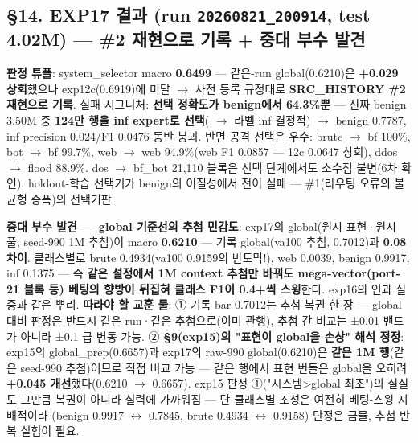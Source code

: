 \subsection{§14. EXP17 결과 (run \texttt{20260821\allowbreak{}\_\allowbreak{}\allowbreak{}200914}, test 4.02M) — \#2 재현으로 기록 +\allowbreak{} 중대 부수 발견}
\textbf{판정 튜플}: system\_\allowbreak{}selector macro \textbf{0.6499} — 같은-run global(0.6210)은 \textbf{+\allowbreak{}0.029 상회}했으나 exp12c(0.6919)에 미달  \ensuremath{\rightarrow}  사전 등록 규정대로 \textbf{SRC\_\allowbreak{}HISTORY \#2 재현으로 기록}. 실패 시그니처: \textbf{선택 정확도가 benign에서 64.3\%뿐} — 진짜 benign 3.50M 중 \textbf{124만 행을 inf expert로 선택}( \ensuremath{\rightarrow}  라벨 inf 결정적)  \ensuremath{\rightarrow}  benign 0.7787, inf precision 0.024/\allowbreak{}F1 0.0476 동반 붕괴. 반면 공격 선택은 우수: brute \ensuremath{\rightarrow} bf 100\%, bot \ensuremath{\rightarrow} bf 99.7\%, web \ensuremath{\rightarrow} web 94.9\%(web F1 0.0857 — 12c 0.0647 상회), ddos \ensuremath{\rightarrow} flood 88.9\%. dos \ensuremath{\rightarrow} bf\_\allowbreak{}bot 21,110 블록은 선택 단계에서도 소수점 불변(6차 확인). holdout-학습 선택기가 benign의 이질성에서 전이 실패 — \#1(라우팅 오류의 불균형 증폭)의 선택기판.

\textbf{중대 부수 발견 — global 기준선의 추첨 민감도}: exp17의 global(원시 표현·원시 풀, seed-990 1M 추첨)이 macro \textbf{0.6210} — 기록 global(va100 추첨, 0.7012)과 \textbf{0.08 차이}. 클래스별로 brute 0.4934(va100 0.9159의 반토막!), web 0.0039, benign 0.9917, inf 0.1375 — 즉 \textbf{같은 설정에서 1M context 추첨만 바꿔도 mega-vector(port-21 블록 등) 베팅의 향방이 뒤집혀 클래스 F1이 0.4+\allowbreak{}씩 스윙}한다. exp16의 인과 실증과 같은 뿌리. \textbf{따라야 할 교훈 둘}: ① 기록 bar 0.7012는 추첨 복권 한 장 — global 대비 판정은 반드시 같은-run·같은-추첨으로(이미 관행), 추첨 간 비교는 ±0.01 밴드가 아니라 ±0.1 급 변동 가능. ② \textbf{§9(exp15)의 "표현이 global을 손상" 해석 정정}: exp15의 global\_\allowbreak{}prep(0.6657)과 exp17의 raw-990 global(0.6210)은 \textbf{같은 1M 행}(같은 seed-990 추첨)이므로 직접 비교 가능 — 같은 행에서 표현 번들은 global을 오히려 \textbf{+\allowbreak{}0.045 개선}했다(0.6210 \ensuremath{\rightarrow} 0.6657). exp15 판정 ①("시스템>global 최초")의 실질도 그만큼 복권이 아니라 실력에 가까워짐 — 단 클래스별 조성은 여전히 베팅-스윙 지배적이라 (benign 0.9917 \ensuremath{\leftrightarrow} 0.7845, brute 0.4934 \ensuremath{\leftrightarrow} 0.9158) 단정은 금물, 추첨 반복 실험이 필요.


